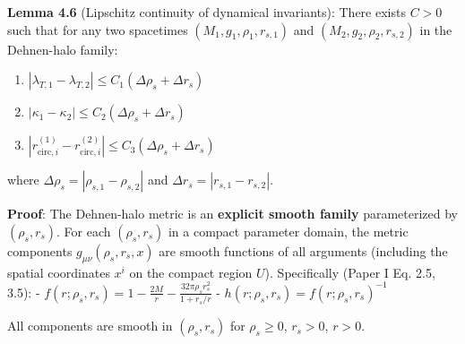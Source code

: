 \documentclass[
]{article}
\providecommand{\tightlist}{%
  \setlength{\itemsep}{0pt}\setlength{\parskip}{0pt}}
\begin{document}
\textbf{Lemma 4.6} (Lipschitz continuity of dynamical invariants): There
exists \(C > 0\) such that for any two spacetimes
\((M_1, g_1, \rho_1, r_{s,1})\) and \((M_2, g_2, \rho_2, r_{s,2})\) in
the Dehnen-halo family:

\begin{enumerate}
\def\labelenumi{\arabic{enumi}.}
\tightlist
\item
  \(|\lambda_{T,1} - \lambda_{T,2}| \leq C_1 (\Delta\rho_s + \Delta r_s)\)
\item
  \(|\kappa_1 - \kappa_2| \leq C_2 (\Delta\rho_s + \Delta r_s)\)
\item
  \(|r_{\text{circ},i}^{(1)} - r_{\text{circ},i}^{(2)}| \leq C_3 (\Delta\rho_s + \Delta r_s)\)
\end{enumerate}

where \(\Delta\rho_s = |\rho_{s,1} - \rho_{s,2}|\) and
\(\Delta r_s = |r_{s,1} - r_{s,2}|\).

\textbf{Proof}: The Dehnen-halo metric is an \textbf{explicit smooth
family} parameterized by \((\rho_s, r_s)\). For each \((\rho_s, r_s)\)
in a compact parameter domain, the metric components
\(g_{\mu\nu}(\rho_s, r_s, x)\) are smooth functions of all arguments
(including the spatial coordinates \(x^i\) on the compact region \(U\)).
Specifically (Paper I Eq. 2.5, 3.5): -
\(f(r; \rho_s, r_s) = 1 - \frac{2M}{r} - \frac{32\pi\rho_s r_s^2}{1 + r_s/r}\)
- \(h(r; \rho_s, r_s) = f(r; \rho_s, r_s)^{-1}\)

All components are smooth in \((\rho_s, r_s)\) for \(\rho_s \geq 0\),
\(r_s > 0\), \(r > 0\).
\end{document}
